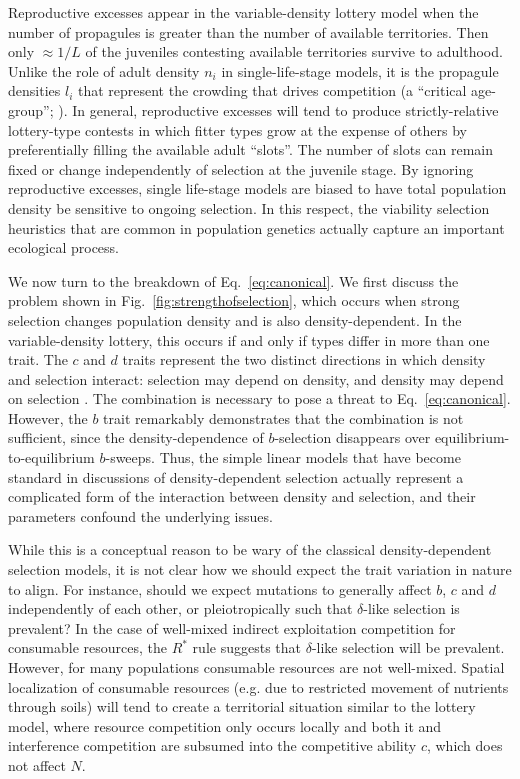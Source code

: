 \documentclass[12pt]{article}
\begin{document}
Reproductive excesses appear in the variable-density lottery model when the number of propagules is greater than the number of available territories. Then only $\approx 1/L$ of the juveniles contesting available territories survive to adulthood. Unlike the role of adult density $n_i$ in single-life-stage models, it is the propagule densities $l_i$ that represent the crowding that drives competition (a ``critical age-group''; \citealt[pp. 54]{charlesworth_1994}). In general, reproductive excesses will tend to produce strictly-relative lottery-type contests in which fitter types grow at the expense of others by preferentially filling the available adult ``slots''. The number of slots can remain fixed or change independently of selection at the juvenile stage. By ignoring reproductive excesses, single life-stage models are biased to have total population density be sensitive to ongoing selection. In this respect, the viability selection heuristics that are common in population genetics \cite[pp. 61]{gillespie_2004} actually capture an important ecological process.

We now turn to the breakdown of Eq.~\eqref{eq:canonical}. We first discuss the problem shown in Fig.~\ref{fig:strengthofselection}, which occurs when strong selection changes population density and is also density-dependent. In the variable-density lottery, this occurs if and only if types differ in more than one trait. The $c$ and $d$ traits represent the two distinct directions in which density and selection interact: selection may depend on density, and density may depend on selection \citep{prout_1980}. The combination is necessary to pose a threat to Eq.~\eqref{eq:canonical}. However, the $b$ trait remarkably demonstrates that the combination is not sufficient, since the density-dependence of $b$-selection disappears over equilibrium-to-equilibrium $b$-sweeps. Thus, the simple linear models that have become standard in discussions of density-dependent selection \citep{roughgarden_1979,christiansen_2004,mallet_2012,travis_2013} actually represent a complicated form of the interaction between density and selection, and their parameters confound the underlying issues. 

While this is a conceptual reason to be wary of the classical density-dependent selection models, it is not clear how we should expect the trait variation in nature to align. For instance, should we expect mutations to generally affect $b$, $c$ and $d$ independently of each other, or pleiotropically such that $\delta$-like selection is prevalent? In the case of well-mixed indirect exploitation competition for consumable resources, the $R^*$ rule  suggests that $\delta$-like selection will be prevalent. However, for many populations consumable resources are not well-mixed. Spatial localization of consumable resources (e.g. due to restricted movement of  nutrients through soils) will tend to create a territorial situation similar to the lottery model, where resource competition only occurs locally and both it and interference competition are subsumed into the competitive ability $c$, which does not affect $N$. 
\end{document}
